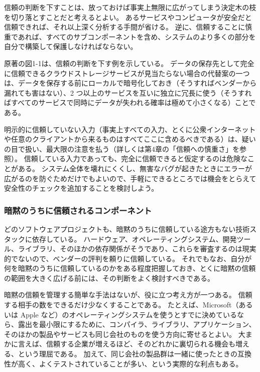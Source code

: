 \documentclass[uplatex]{jsarticle}
\def\label#1{}%
\begin{document}
信頼の判断を下すことは、放っておけば事実上無限に広がってしまう決定木の枝を切り落とすことだと考えるとよい。
あるサービスやコンピュータが安全だと信頼できれば、それ以上深く分析する手間が省ける。
逆に、信頼することに慎重であれば、すべてのサブコンポーネントを含め、システムのより多くの部分を自分で構築して保護しなければならない。

\begin{exa}[クラウドストレージについての信頼の判断]\label{exa:ch1-cloud-storage-trust}
原著の図1-1は、信頼の判断を下す例を示している。
データの保存先として完全に信頼できるクラウドストレージサービスが見当たらない場合の代替案の一つは、データを保存する前にローカルで暗号化しておき（そうすればベンダーから漏れても害はない）、2 つ以上のサービスを互いに独立に冗長に使う（そうすればすべてのサービスで同時にデータが失われる確率は極めて小さくなる）ことである。
\end{exa}

明示的に信頼していない入力（事実上すべての入力、とくに公衆インターネットや任意のクライアントから来るものはすべてここに含めるべきである）は、疑いの目で扱い、最大限の注意を払う（詳しくは第4章の「信頼への慎重さ」を参照）。
信頼している入力であっても、完全に信頼できると仮定するのは危険なことがある。
システム全体を壊れにくくし、無害なバグが起きたときにエラーが広がるのを防ぐためだけでもよいので、手軽にできるところでは機会をとらえて安全性のチェックを追加することを検討しよう。

\subsubsection{暗黙のうちに信頼されるコンポーネント}

どのソフトウェアプロジェクトも、暗黙のうちに信頼している途方もない技術スタックに依存している。
ハードウェア、オペレーティングシステム、開発ツール、ライブラリ、そのほかの依存関係がそうであり、これらを審査するのは現実的でないので、ベンダーの評判を頼りに信頼している。
それでもなお、自分が何を暗黙のうちに信頼しているのかをある程度把握しておき、とくに暗黙の信頼の範囲を大きく広げる前には、その判断をよく検討すべきである。

暗黙の信頼を管理する簡単な手法はないが、役に立つ考え方が一つある。
信頼する相手の数をできるだけ少なくすることである。
たとえば、Microsoft（あるいは Apple など）のオペレーティングシステムを使うとすでに決めているなら、露出を最小限にするために、コンパイラ、ライブラリ、アプリケーション、そのほかの製品やサービスも同じ会社のものを使う方向に寄せるとよい。
大まかに言えば、信頼する企業が増えるほど、そのどれかに裏切られる機会も増える、という理屈である。
加えて、同じ会社の製品群は一緒に使ったときの互換性が高く、よくテストされていることが多い、という実際的な利点もある。
\end{document}
